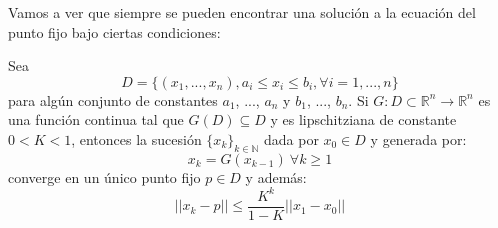 


 Vamos a ver que siempre se pueden encontrar una solución a la ecuación del punto fijo bajo ciertas condiciones:

\begin{theorem}
	Sea $$D = \{(x_1,...,x_n) , a_i \leq x_i \leq b_i, \forall i = 1 ,..., n\}$$ para algún conjunto de constantes $a_1$, ..., $a_n$ y $b_1$, ..., $b_n$. Si $G : D \subset \mathbb{R}^n \longrightarrow \mathbb{R}^n$ es una función continua tal que $G(D) \subseteq D$ y es lipschitziana de constante $0<K<1$, entonces la sucesión $\{x_{k}\}_{k \in \mathbb{N}}$ dada por $x_{0} \in D$ y generada por:
	\[x_{k} = G(x_{k-1} )\ \forall k \geq 1\]
	converge en un único punto fijo $p \in D$ y además:
	\[||x_{k} - p|| \leq \frac{K^k}{1-K}||x_{1} - x_{0}|| \]
\end{theorem}


